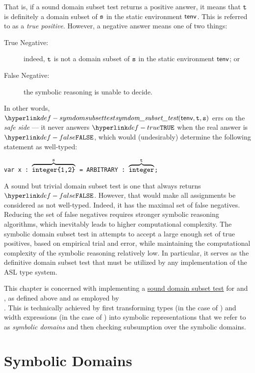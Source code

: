That is, if a sound domain subset test returns a positive answer, it means that
$\texttt{t}$ is definitely a domain subset of $\texttt{s}$ in the static environment $\textsf{tenv}$.
This is referred to as a \emph{true positive}.
However, a negative answer means one of two things:
\begin{description}
  \item[True Negative:] indeed, $\texttt{t}$ is not a domain subset of $\texttt{s}$ in the static environment $\textsf{tenv}$; or
  \item[False Negative:] the symbolic reasoning is unable to decide.
\end{description}

In other words, $\symdomsubsettest(\tenv, \vt, \vs)$ errs on the \emph{safe side} ---
it never answers $\True$ when the real answer is $\False$, which would (undesirably)
determine the following statement as well-typed:
\begin{center}
\texttt{var x : $\overbrace{\texttt{integer\{1,2\}}}^{\texttt{s}}$ = ARBITRARY : $\overbrace{\texttt{integer}}^{\texttt{t}}$;}
\end{center}

A sound but trivial domain subset test is one that always returns $\False$.
However, that would make all assignments be considered as not well-typed.
Indeed, it has the maximal set of false negatives.
Reducing the set of false negatives requires stronger symbolic reasoning algorithms,
which inevitably leads to higher computational complexity.
%
The symbolic domain subset test in 
attempts to accept a large enough set of true positives, based on empirical trial and error,
while maintaining the computational complexity of the symbolic reasoning relatively low.
%
In particular, it serves as the definitive domain subset test that must be utilized
by any implementation of the ASL type system.

This chapter is concerned with implementing a \hyperlink{def-symdomsubsettest}{sound domain subset test}
for \integertypesterm{} and \bitvectortypesterm, as defined above and as employed by \\
.
This is technically achieved by first transforming types (in the case of \integertypesterm{})
and width expressions (in the case of \bitvectortypesterm{}) into symbolic representations
that we refer to as \emph{symbolic domains} and then checking subsumption over the symbolic domains.

\section{Symbolic Domains}
\hypertarget{def-symbolicdomain}{}


